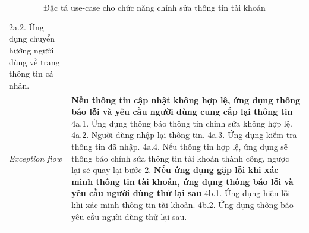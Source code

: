 \begin{center}
\begin{longtable}{
        |>{\raggedright\arraybackslash}p{3cm}
        |>{\raggedright\arraybackslash}p{13cm}
        |}
        2a.2. Ứng dụng chuyển hướng người dùng về trang thông tin cá nhân.
        \\\hdashline
        \rowcolor{cyan!10!white} \textit{Exception flow} &
        \textbf{Nếu thông tin cập nhật không hợp lệ, ứng dụng thông báo lỗi và yêu cầu người dùng cung cấp lại thông tin} \newline
        4a.1. Ứng dụng thông báo thông tin chỉnh sửa không hợp lệ. \newline
        4a.2. Người dùng nhập lại thông tin. \newline
        4a.3. Ứng dụng kiểm tra thông tin đã nhập. \newline
        4a.4. Nếu thông tin hợp lệ, ứng dụng sẽ thông báo chỉnh sửa thông tin tài khoản thành công, ngược lại sẽ quay lại bước 2. \newline
        \textbf{Nếu ứng dụng gặp lỗi khi xác minh thông tin tài khoản, ứng dụng thông báo lỗi và yêu cầu người dùng thử lại sau} \newline
        4b.1. Ứng dụng hiện lỗi khi xác minh thông tin tài khoản. \newline
        4b.2. Ứng dụng thông báo yêu cầu người dùng thử lại sau.
        \\\hline
        \caption{Đặc tả use-case cho chức năng chỉnh sửa thông tin tài khoản}
    \end{longtable}
\end{center}
